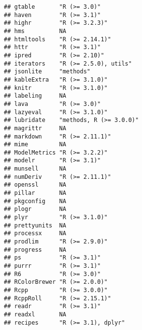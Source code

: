 \documentclass[]{article}
\begin{document}
\begin{verbatim}
## gtable       "R (>= 3.0)"                                     
## haven        "R (>= 3.1)"                                     
## highr        "R (>= 3.2.3)"                                   
## hms          NA                                               
## htmltools    "R (>= 2.14.1)"                                  
## httr         "R (>= 3.1)"                                     
## ipred        "R (>= 2.10)"                                    
## iterators    "R (>= 2.5.0), utils"                            
## jsonlite     "methods"                                        
## kableExtra   "R (>= 3.1.0)"                                   
## knitr        "R (>= 3.1.0)"                                   
## labeling     NA                                               
## lava         "R (>= 3.0)"                                     
## lazyeval     "R (>= 3.1.0)"                                   
## lubridate    "methods, R (>= 3.0.0)"                          
## magrittr     NA                                               
## markdown     "R (>= 2.11.1)"                                  
## mime         NA                                               
## ModelMetrics "R (>= 3.2.2)"                                   
## modelr       "R (>= 3.1)"                                     
## munsell      NA                                               
## numDeriv     "R (>= 2.11.1)"                                  
## openssl      NA                                               
## pillar       NA                                               
## pkgconfig    NA                                               
## plogr        NA                                               
## plyr         "R (>= 3.1.0)"                                   
## prettyunits  NA                                               
## processx     NA                                               
## prodlim      "R (>= 2.9.0)"                                   
## progress     NA                                               
## ps           "R (>= 3.1)"                                     
## purrr        "R (>= 3.1)"                                     
## R6           "R (>= 3.0)"                                     
## RColorBrewer "R (>= 2.0.0)"                                   
## Rcpp         "R (>= 3.0.0)"                                   
## RcppRoll     "R (>= 2.15.1)"                                  
## readr        "R (>= 3.1)"                                     
## readxl       NA                                               
## recipes      "R (>= 3.1), dplyr"                              

\end{verbatim}
\end{document}
